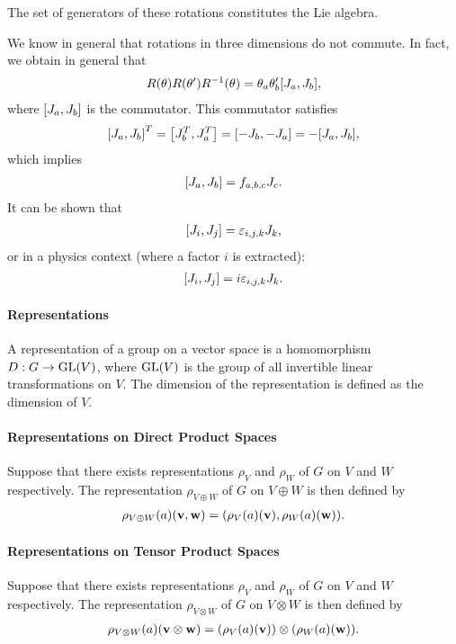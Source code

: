 The set of generators of these rotations constitutes the Lie algebra.

We know in general that rotations in three dimensions do not commute. In fact, we obtain in general that
\begin{align*}
	R(\vb{\theta})R(\vb{\theta}')R^{-1}(\vb{\theta}) = \theta_{a}\theta_{b}'\comm{J_{a}}{J_{b}},
\end{align*}
where $\comm{J_{a}}{J_{b}}$ is the commutator. This commutator satisfies
\begin{align*}
	\comm{J_{a}}{J_{b}}^{T} = \comm{J_{b}^{T}}{J_{a}^{T}} = \comm{-J_{b}}{-J_{a}} = -\comm{J_{a}}{J_{b}},
\end{align*}
which implies
\begin{align*}
	\comm{J_{a}}{J_{b}} = f_{a,b,c}J_{c}.
\end{align*}
It can be shown that
\begin{align*}
	\comm{J_{i}}{J_{j}} = \varepsilon_{i,j,k}J_{k},
\end{align*}
or in a physics context (where a factor $i$ is extracted):
\begin{align*}
	\comm{J_{i}}{J_{j}} = i\varepsilon_{i,j,k}J_{k}.
\end{align*}

\paragraph{Representations}
A representation of a group on a vector space is a homomorphism $D: G\to\text{GL}(V)$, where $\text{GL}(V)$ is the group of all invertible linear transformations on $V$. The dimension of the representation is defined as the dimension of $V$.

\paragraph{Representations on Direct Product Spaces}
Suppose that there exists representations $\rho_{V}$ and $\rho_{W}$ of $G$ on $V$ and $W$ respectively. The representation $\rho_{V\oplus W}$ of $G$ on $V\oplus W$ is then defined by
\begin{align*}
	\rho_{V\oplus W}(a)(\vb{v}, \vb{w}) = (\rho_{V}(a)(\vb{v}), \rho_{W}(a)(\vb{w})).
\end{align*}

\paragraph{Representations on Tensor Product Spaces}
Suppose that there exists representations $\rho_{V}$ and $\rho_{W}$ of $G$ on $V$ and $W$ respectively. The representation $\rho_{V\otimes W}$ of $G$ on $V\otimes W$ is then defined by
\begin{align*}
	\rho_{V\otimes W}(a)(\vb{v}\otimes\vb{w}) = (\rho_{V}(a)(\vb{v}))\otimes(\rho_{W}(a)(\vb{w})).
\end{align*}

